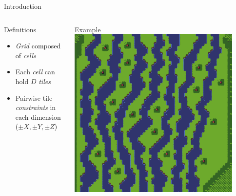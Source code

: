\documentclass{beamer}
\begin{document}
  \begin{frame}[fragile]{Introduction}
    \begin{columns}[T,onlytextwidth]
        \begin{block}{Definitions}
          \begin{itemize}
            \item \textit{Grid} composed of \textit{cells}
            \item Each \textit{cell} can hold $D$ \textit{tiles}
            \item Pairwise tile \textit{constraints} in each dimension ($\pm X, \pm Y, \pm Z$)
          \end{itemize}
        \end{block}
        \begin{block}{Example}
          \includegraphics[width=0.9\textwidth]{img/forestmicro_64x64.pdf}
        \end{block}
    \end{columns}
  \end{frame}
\end{document}
